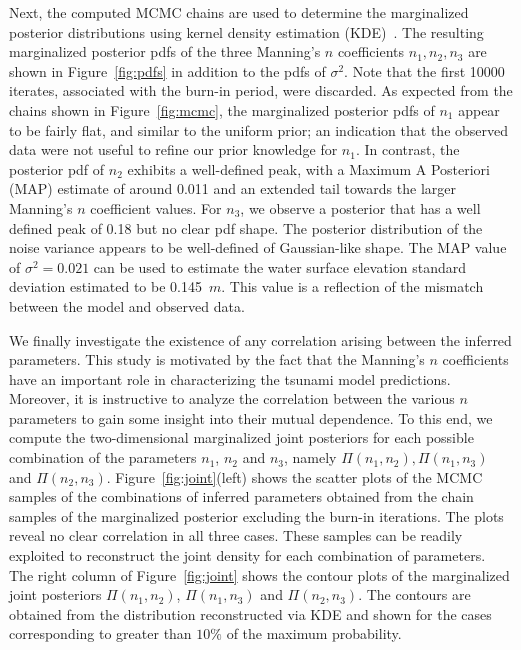 Next, the computed MCMC chains are used to determine the marginalized posterior 
distributions using kernel density estimation (KDE)~\citep{Parzen1962,Silverman1986}.  
The resulting marginalized posterior pdfs of the three Manning's $n$ coefficients 
$n_1,n_2,n_3$ are shown in Figure~\ref{fig:pdfs} in addition to the pdfs of $\sigma^2$. 
Note that the first 10000 iterates, associated with the burn-in period, were discarded.  
As expected from the chains shown in Figure~\ref{fig:mcmc}, the marginalized posterior 
pdfs of $n_1$ appear to be fairly flat, and similar to the uniform prior; an indication 
that the observed data were not useful to refine our prior knowledge for $n_1$. In 
contrast, the posterior pdf of $n_2$ exhibits a well-defined peak, with a Maximum A 
Posteriori (MAP) estimate of around 0.011 and an extended tail towards the larger 
Manning's $n$ coefficient values. For $n_3$, we observe a posterior that has a well 
defined peak of 0.18 but no clear pdf shape. The posterior distribution of the noise variance 
appears to be well-defined of Gaussian-like shape. The MAP value of $\sigma^2=0.021$ 
can be used to estimate the water surface elevation standard deviation estimated to 
be 0.145~$m$. This value is a reflection of the mismatch between the model and 
observed data.

We finally investigate the existence of any correlation arising between the inferred parameters.
This study is motivated by the fact that the Manning's $n$ coefficients have an important role 
in characterizing the tsunami model predictions. Moreover, it is instructive to analyze the 
correlation between the various $n$ parameters to gain some insight into their mutual dependence.
To this end, we compute the two-dimensional marginalized joint posteriors for each 
possible combination of the parameters $n_1$, $n_2$ and $n_3$, namely $\Pi(n_1, n_2), \Pi(n_1, n_3)$ and $\Pi(n_2, n_3)$. 
Figure~\ref{fig:joint}(left) shows the scatter plots of the MCMC samples of the combinations of 
inferred parameters obtained from the chain samples of the marginalized posterior excluding 
the burn-in iterations. The plots reveal no clear correlation in all three cases. 
These samples can be readily exploited to reconstruct the joint density for each combination of parameters. 
The right column of Figure~\ref{fig:joint} shows the contour plots of the marginalized joint posteriors 
$\Pi(n_1, n_2)$, $\Pi(n_1, n_3)$ and $\Pi(n_2, n_3)$. The contours are obtained from the
distribution reconstructed via KDE and shown for the cases corresponding to greater than $10\%$
of the maximum probability.

